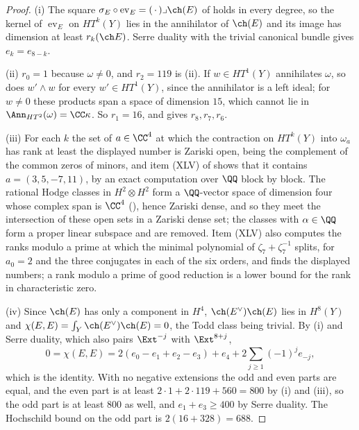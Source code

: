 \begin{proof}
(i) The square $\sigma_{E}\circ\operatorname{ev}_{E}=(\,\cdot\,)\lrcorner
\ch(E)$ of  holds in every degree, so the kernel of
$\operatorname{ev}_{E}$ on $HT^{k}(Y)$ lies in the annihilator of $\ch(E)$
and its image has dimension at least $r_{k}(\ch E)$. Serre duality with the
trivial canonical bundle gives $e_{k}=e_{8-k}$.

(ii) $r_{0}=1$ because $\omega\ne0$, and $r_{2}=119$ is
(ii). If $w\in HT^{1}(Y)$ annihilates $\omega$, so does
$w'\wedge w$ for every $w'\in HT^{1}(Y)$, since the annihilator is a left
ideal; for $w\ne0$ these products span a space of dimension $15$, which cannot
lie in $\Ann_{HT^{2}}(\omega)=\CC\kappa$. So $r_{1}=16$, and
 gives $r_{8},r_{7},r_{6}$.

(iii) For each $k$ the set of $a\in\CC^{4}$ at which the contraction on
$HT^{k}(Y)$ into $\omega_{a}$ has rank at least the displayed number is Zariski
open, being the complement of the common zeros of minors, and item (XLV) of
 shows that it contains $a=(3,5,-7,11)$, by an exact
computation over $\QQ$ block by block. The rational Hodge classes in
$H^{2}\otimes H^{2}$ form a $\QQ$-vector space of dimension four whose complex
span is $\CC^{4}$ (), hence Zariski dense, and so they
meet the intersection of these open sets in a Zariski dense set; the classes
with $\alpha\in\QQ$ form a proper linear subspace and are removed. Item (XLV)
also computes the ranks modulo a prime at which the minimal polynomial of
$\zeta_{7}+\zeta_{7}^{-1}$ splits, for $a_{0}=2$ and the three conjugates in
each of the six orders, and finds the displayed numbers; a rank modulo a prime
of good reduction is a lower bound for the rank in characteristic zero.

(iv) Since $\ch(E)$ has only a component in $H^{4}$, $\ch(E^{\vee})\ch(E)$
lies in $H^{8}(Y)$ and $\chi(E,E)=\int_{Y}\ch(E^{\vee})\ch(E)=0$, the Todd
class being trivial. By (i) and Serre duality, which also pairs
$\Ext^{-j}$ with $\Ext^{8+j}$,
\[
  0=\chi(E,E)=2(e_{0}-e_{1}+e_{2}-e_{3})+e_{4}
  +2\sum_{j\ge1}(-1)^{j}e_{-j},
\]
which is the identity. With no negative extensions the odd and even parts are
equal, and the even part is at least $2\cdot1+2\cdot119+560=800$ by (i) and
(iii), so the odd part is at least $800$ as well, and $e_{1}+e_{3}\ge400$ by
Serre duality. The Hochschild bound on the odd part is $2(16+328)=688$.
\end{proof}

